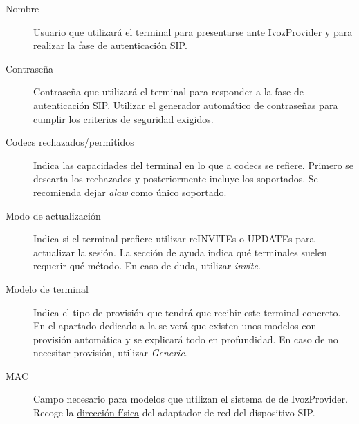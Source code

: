 \documentclass[letterpaper,10pt,spanish]{sphinxmanual}
\begin{document}
\noindent{}
\begin{description}
\item[{Nombre}] \leavevmode{}\label{pbx_features/terminals:term-nombre}
Usuario que utilizará el terminal para presentarse ante IvozProvider y para realizar la fase de autenticación SIP.

\item[{Contraseña}] \leavevmode{}\label{pbx_features/terminals:term-contrasena}
Contraseña que utilizará el terminal para responder a la fase de autenticación SIP. Utilizar el generador automático de contraseñas para cumplir los criterios de seguridad exigidos.

\item[{Codecs rechazados/permitidos}] \leavevmode{}\label{pbx_features/terminals:term-codecs-rechazados-permitidos}
Indica las capacidades del terminal en lo que a codecs se refiere. Primero se descarta los rechazados y posteriormente incluye los soportados. Se recomienda dejar \emph{alaw} como único soportado.

\item[{Modo de actualización}] \leavevmode{}\label{pbx_features/terminals:term-modo-de-actualizacion}
Indica si el terminal prefiere utilizar reINVITEs o UPDATEs para actualizar la sesión. La sección de ayuda indica qué terminales suelen requerir qué método. En caso de duda, utilizar \emph{invite}.

\item[{Modelo de terminal}] \leavevmode{}\label{pbx_features/terminals:term-modelo-de-terminal}
Indica el tipo de provisión que tendrá que recibir este terminal concreto. En el apartado dedicado a la {\hyperref[provisioning/index:provisioning]{}} se verá que existen unos modelos con provisión automática y se explicará todo en profundidad. En caso de no necesitar provisión, utilizar \emph{Generic}.

\item[{MAC}] \leavevmode{}\label{pbx_features/terminals:term-mac}
Campo necesario para modelos que utilizan el sistema de {\hyperref[provisioning/index:provisioning]{}} de IvozProvider. Recoge la \href{https://es.wikipedia.org/wiki/Direcci\%C3\%B3n\_MAC}{dirección física} del adaptador de red del dispositivo SIP.

\end{description}
\end{document}

